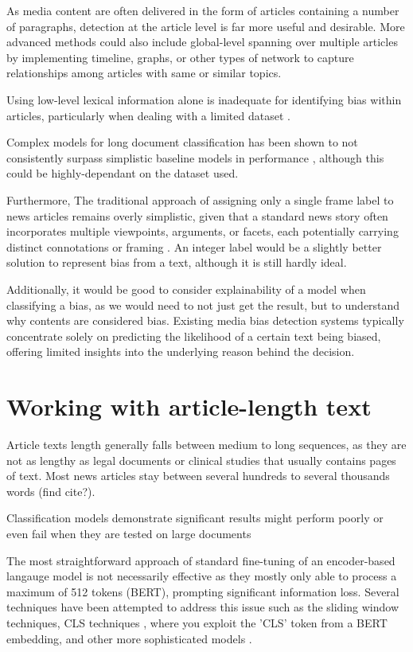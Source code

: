 As media content are often delivered in the form of articles containing a number of paragraphs, detection at the article level is far more useful and desirable. More advanced methods could also include global-level spanning over multiple articles by implementing timeline, graphs, or other types of network to capture relationships among articles with same or similar topics.

Using low-level lexical information alone is inadequate for identifying bias within articles, particularly when dealing with a limited dataset \cite{chen-2020-detecting-media-bias-gaussian}.

Complex models for long document classification has been shown to not consistently surpass simplistic baseline models in performance \cite{park-2022-efficient}, although this could be highly-dependant on the dataset used.

Furthermore, The traditional approach of assigning only a single frame label to news articles remains overly simplistic, given that a standard news story often incorporates multiple viewpoints, arguments, or facets, each potentially carrying distinct connotations or framing \cite{vallejo-2023-connecting}. An integer label would be a slightly better solution to represent bias from a text, although it is still hardly ideal.

Additionally, it would be good to consider explainability of a model when classifying a bias, as we would need to not just get the result, but to understand why contents are considered bias. Existing media bias detection systems typically concentrate solely on predicting the likelihood of a certain text being biased, offering limited insights into the underlying reason behind the decision.

\section{Working with article-length text}

Article texts length generally falls between medium to long sequences, as they are not as lengthy as legal documents or clinical studies that usually contains pages of text. Most news articles stay between several hundreds to several thousands words (find cite?).

Classification models demonstrate significant results might perform poorly or even fail when they are tested on large documents \cite{wan-2019-long-length}

The most straightforward approach of standard fine-tuning of an encoder-based langauge model is not necessarily effective as they mostly only able to process a maximum of 512 tokens (BERT), prompting significant information loss. Several techniques have been attempted to address this issue such as the sliding window techniques, CLS techniques \cite{su-2021-classifying}, where you exploit the 'CLS' token from a BERT embedding, and other more sophisticated models \cite{kulkarni-2018-multi-view}.

